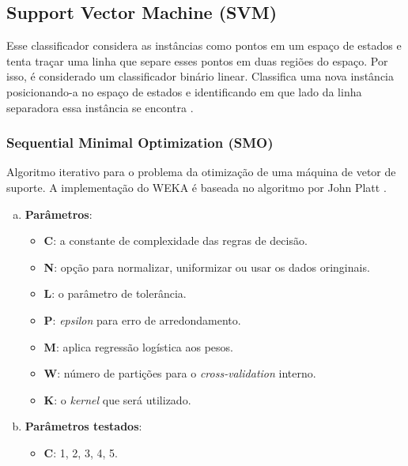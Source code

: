 \subsection{Support Vector Machine (SVM)}

Esse classificador considera as instâncias como pontos em um espaço de estados e tenta traçar uma linha que separe esses pontos em duas regiões do espaço. Por isso, é considerado um classificador binário linear. Classifica uma nova instância posicionando-a no espaço de estados e identificando em que lado da linha separadora essa instância se encontra \cite{Cortes1995}.

\subsubsection{Sequential Minimal Optimization (SMO)}

Algoritmo iterativo para o problema da otimização de uma máquina de vetor de suporte. A implementação do WEKA é baseada no algoritmo por John Platt \cite{Platt1998}.

\begin{enumerate}[a)]
    \item \textbf{Parâmetros}:
        \begin{itemize}

            \item \textbf{C}: a constante de complexidade das regras de decisão.

            \item \textbf{N}: opção para normalizar, uniformizar ou usar os dados oringinais.

            \item \textbf{L}: o parâmetro de tolerância.

            \item \textbf{P}: \emph{epsilon} para erro de arredondamento.

            \item \textbf{M}: aplica regressão logística aos pesos.

            \item \textbf{W}: número de partições para o \emph{cross-validation} interno.

            \item \textbf{K}: o \emph{kernel} que será utilizado.
        \end{itemize}
    \item \textbf{Parâmetros testados}:
        \begin{itemize}
            \item \textbf{C}: 1, 2, 3, 4, 5.
        \end{itemize}
\end{enumerate}


